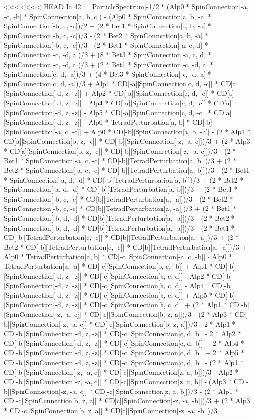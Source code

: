 <<<<<<< HEAD
In[42]:= ParticleSpectrum[-1/2 * (Alp0 * SpinConnection[-a, -c, -b] * SpinConnection[a, b, c]) - (Alp0 * SpinConnection[a, b, -a] * SpinConnection[-b, c, -c])/2 + (2 * Bet1 * SpinConnection[a, b, -a] * SpinConnection[-b, c, -c])/3 - (2 * Bet2 * SpinConnection[a, b, -a] * SpinConnection[-b, c, -c])/3 - (2 * Bet1 * SpinConnection[-a, c, d] * SpinConnection[-c, -d, a])/3 + (8 * Bet3 * SpinConnection[-a, c, d] * SpinConnection[-c, -d, a])/3 + (2 * Bet1 * SpinConnection[-c, -d, a] * SpinConnection[c, d, -a])/3 + (4 * Bet3 * SpinConnection[-c, -d, a] * SpinConnection[c, d, -a])/3 + Alp1 * CD[-a][SpinConnection[c, d, -c]] * CD[a][SpinConnection[-d, z, -z]] + Alp2 * CD[-a][SpinConnection[c, d, -c]] * CD[a][SpinConnection[-d, z, -z]] - Alp4 * CD[-a][SpinConnection[c, d, -c]] * CD[a][SpinConnection[-d, z, -z]] - Alp5 * CD[-a][SpinConnection[c, d, -c]] * CD[a][SpinConnection[-d, z, -z]] - Alp0 * TetradPerturbation[a, b] * CD[-b][SpinConnection[-a, c, -c]] + Alp0 * CD[-b][SpinConnection[a, b, -a]] - (2 * Alp1 * CD[a][SpinConnection[b, z, -c]] * CD[-b][SpinConnection[-z, -a, c]])/3 + (2 * Alp3 * CD[a][SpinConnection[b, z, -c]] * CD[-b][SpinConnection[-z, -a, c]])/3 - (2 * Bet1 * SpinConnection[-a, c, -c] * CD[-b][TetradPerturbation[a, b]])/3 + (2 * Bet2 * SpinConnection[-a, c, -c] * CD[-b][TetradPerturbation[a, b]])/3 - (2 * Bet1 * SpinConnection[-a, d, -d] * CD[-b][TetradPerturbation[a, b]])/3 + (2 * Bet2 * SpinConnection[-a, d, -d] * CD[-b][TetradPerturbation[a, b]])/3 + (2 * Bet1 * SpinConnection[-b, c, -c] * CD[b][TetradPerturbation[a, -a]])/3 - (2 * Bet2 * SpinConnection[-b, c, -c] * CD[b][TetradPerturbation[a, -a]])/3 + (2 * Bet1 * SpinConnection[-b, d, -d] * CD[b][TetradPerturbation[a, -a]])/3 - (2 * Bet2 * SpinConnection[-b, d, -d] * CD[b][TetradPerturbation[a, -a]])/3 - (2 * Bet1 * CD[-b][TetradPerturbation[c, -c]] * CD[b][TetradPerturbation[a, -a]])/3 + (2 * Bet2 * CD[-b][TetradPerturbation[c, -c]] * CD[b][TetradPerturbation[a, -a]])/3 + Alp0 * TetradPerturbation[a, b] * CD[-c][SpinConnection[-a, c, -b]] - Alp0 * TetradPerturbation[a, -a] * CD[-c][SpinConnection[b, c, -b]] + Alp1 * CD[-b][SpinConnection[-d, z, -z]] * CD[-c][SpinConnection[b, c, d]] - Alp2 * CD[-b][SpinConnection[-d, z, -z]] * CD[-c][SpinConnection[b, c, d]] - Alp4 * CD[-b][SpinConnection[-d, z, -z]] * CD[-c][SpinConnection[b, c, d]] + Alp5 * CD[-b][SpinConnection[-d, z, -z]] * CD[-c][SpinConnection[b, c, d]] + (2 * Alp1 * CD[-b][SpinConnection[-z, -a, c]] * CD[-c][SpinConnection[b, z, a]])/3 - (2 * Alp3 * CD[-b][SpinConnection[-z, -a, c]] * CD[-c][SpinConnection[b, z, a]])/3 - 2 * Alp1 * CD[-b][SpinConnection[-d, z, -z]] * CD[-c][SpinConnection[c, d, b]] - 2 * Alp2 * CD[-b][SpinConnection[-d, z, -z]] * CD[-c][SpinConnection[c, d, b]] + 2 * Alp4 * CD[-b][SpinConnection[-d, z, -z]] * CD[-c][SpinConnection[c, d, b]] + 2 * Alp5 * CD[-b][SpinConnection[-d, z, -z]] * CD[-c][SpinConnection[c, d, b]] - (2 * Alp1 * CD[-b][SpinConnection[-z, -a, c]] * CD[-c][SpinConnection[z, a, b]])/3 - Alp2 * CD[-b][SpinConnection[-z, -a, c]] * CD[-c][SpinConnection[z, a, b]] - (Alp3 * CD[-b][SpinConnection[-z, -a, c]] * CD[-c][SpinConnection[z, a, b]])/3 - (2 * Alp1 * CD[-c][SpinConnection[b, z, a]] * CD[c][SpinConnection[-z, -a, -b]])/3 + (2 * Alp3 * CD[-c][SpinConnection[b, z, a]] * CD[c][SpinConnection[-z, -a, -b]])/3 